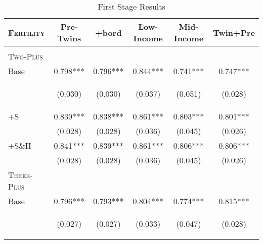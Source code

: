 \begin{table}[htpb!]\caption{First Stage Results} 
\label{TWINtab:FS}\vspace{-5mm}\begin{center}\begin{tabular}{lccccc}
\toprule \toprule 
\textsc{Fertility}& Pre-Twins & +bord & Low-Income & Mid-Income &Twin+Pre\\ \midrule 
\begin{footnotesize}\end{footnotesize}& 
\begin{footnotesize}\end{footnotesize}& 
\begin{footnotesize}\end{footnotesize}& 
\begin{footnotesize}\end{footnotesize}& 
\begin{footnotesize}\end{footnotesize}& 
\begin{footnotesize}\end{footnotesize}\\ 
\textsc{Two-Plus}&&&&&\\
Base&0.798***&0.796***&0.844***&0.741***&0.747***\\
&\begin{footnotesize}(0.030)\end{footnotesize}&\begin{footnotesize}(0.030)\end{footnotesize}&\begin{footnotesize}(0.037)\end{footnotesize}&\begin{footnotesize}(0.051)\end{footnotesize}&\begin{footnotesize}(0.028)\end{footnotesize}\\
+S&0.839***&0.838***&0.861***&0.803***&0.801***\\
&(0.028)&(0.028)&(0.036)&(0.045)&(0.026)\\
+S\&H&0.841***&0.839***&0.861***&0.806***&0.806***\\
&(0.028)&(0.028)&(0.036)&(0.045)&(0.026)\\
\textsc{Three-Plus}&&&&&\\
Base&0.796***&0.793***&0.804***&0.774***&0.815***\\
&\begin{footnotesize}(0.027)\end{footnotesize}&\begin{footnotesize}(0.027)\end{footnotesize}&\begin{footnotesize}(0.033)\end{footnotesize}&\begin{footnotesize}(0.047)\end{footnotesize}&\begin{footnotesize}(0.028)\end{footnotesize}\\

\end{tabular}
\end{center}
\end{table}

